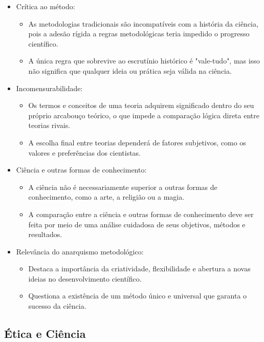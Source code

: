 \begin{itemize}
    \item Crítica ao método:
    \begin{itemize}
        \item As metodologias tradicionais são incompatíveis com a história da ciência, pois a adesão rígida a regras metodológicas teria impedido o progresso científico.
        \item A única regra que sobrevive ao escrutínio histórico é "vale-tudo", mas isso não significa que qualquer ideia ou prática seja válida na ciência.
    \end{itemize}
    \item Incomensurabilidade:
    \begin{itemize}
        \item Os termos e conceitos de uma teoria adquirem significado dentro do seu próprio arcabouço teórico, o que impede a comparação lógica direta entre teorias rivais.
        \item A escolha final entre teorias dependerá de fatores subjetivos, como os valores e preferências dos cientistas.
    \end{itemize}
    \item Ciência e outras formas de conhecimento:
    \begin{itemize}
        \item A ciência não é necessariamente superior a outras formas de conhecimento, como a arte, a religião ou a magia.
        \item A comparação entre a ciência e outras formas de conhecimento deve ser feita por meio de uma análise cuidadosa de seus objetivos, métodos e resultados.
    \end{itemize}
    \item Relevância do anarquismo metodológico:
    \begin{itemize}
        \item Destaca a importância da criatividade, flexibilidade e abertura a novas ideias no desenvolvimento científico.
        \item Questiona a existência de um método único e universal que garanta o sucesso da ciência.
    \end{itemize}
\end{itemize}

\subsection{Ética e Ciência}

